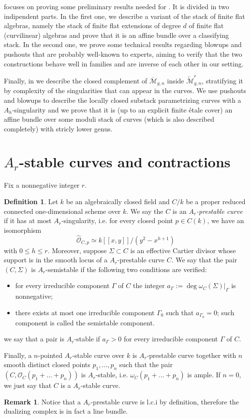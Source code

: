 \documentclass{alggeom}
\numberwithin{equation}{section}
\numberwithin{subsection}{section}
\theoremstyle{definition}
\newtheorem{definition}[theorem]{Definition}
\newtheorem{remark}[theorem]{Remark}
\theoremstyle{remark}
\newcommand\cM{\mathcal{M}} \newcommand\cN{\mathcal{N}}
\newcommand\cO{\mathcal{O}} \newcommand\cP{\mathcal{P}}
\newcommand{\Mbar}{\overline{\cM}}
\newcommand{\Mtilde}{\widetilde{\mathcal M}}
\begin{document}
 focuses on proving some preliminary results needed for . It is divided in two indipendent parts. In the first one, we describe a variant of the stack of finite flat algebras, namely the stack of finite flat extensions of degree $d$ of finite flat (curvilinear) algebras and prove that it is an affine bundle over a classifying stack. In the second one, we prove some technical results regarding blowups and pushouts that are probably well-known to experts, aiming to verify that the two constructions behave well in families and are inverse of each other in our setting.

Finally, in  we describe the closed complement of $\Mbar_{g,n}$ inside $\Mtilde_{g,n}^r$, stratifying it by complexity of the singularities that can appear in the curves. We use pushouts and blowups to describe the locally closed substack parametrizing curves with a $A_h$-singularity and we prove that it is (up to an explicit finite \'etale cover) an affine bundle over some moduli stack of curves (which is also described completely) with stricly lower genus.


\section{$A_r$-stable curves and contractions}\label{sec:1}
Fix a nonnegative integer $r$.

\begin{definition}	Let $k$ be an algebraically closed field and $C/k$ be a proper reduced connected one-dimensional scheme over $k$. We say the $C$ is an \emph{$A_r$-prestable curve} if it has at most $A_r$-singularity, i.e. for every closed point $p\in C(k)$, we have an isomorphism
$$ \widehat{\cO}_{C,p} \simeq k[[x,y]]/(y^2-x^{h+1}) $$ 
with $ 0\leq h\leq r$. 
Moreover, suppose $\Sigma \subset C$ is an effective Cartier divisor whose support is in the smooth locus of a $A_r$-prestable curve $C$. We say that the pair $(C,\Sigma)$ is $A_r$-semistable if the following two conditions are verified:
\begin{itemize}
 \item for every irreducible component $\Gamma$ of $C$ the integer $a_{\Gamma}:=\deg \omega_C(\Sigma)\vert_{\Gamma} $ is nonnegative;
 \item there exists at most one irreducible component $\Gamma_0$ such that $a_{\Gamma_0} =0$; such component is called the semistable component. 
\end{itemize}
 we say that a pair is $A_r$-stable if $a_{\Gamma}>0$ for every irreducible component $\Gamma$ of $C$.
 
 
 Finally, a $n$-pointed $A_r$-stable curve over $k$ is $A_r$-prestable curve together with $n$ smooth distinct closed points $p_1,\dots,p_n$ such that the pair $(C,\cO_C(p_1+\dots+p_n))$ is $A_r$-stable, i.e. $\omega_C(p_1+\dots+p_n)$ is ample. If $n=0$, we just say that $C$ is a $A_r$-stable curve.
\end{definition}
\begin{remark}
	Notice that a $A_r$-prestable curve is l.c.i by definition, therefore the dualizing complex is in fact a line bundle. 
\end{remark}
\end{document}
